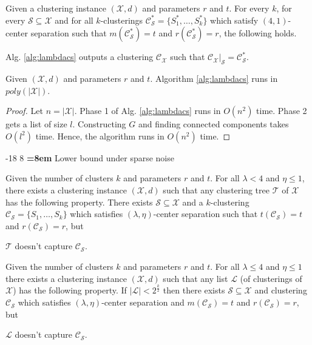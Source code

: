 \documentclass[orivec]{llncs}
\makeatletter
\newcommand{\mc}{\mathcal}
\renewcommand\subsubsection{\@startsection{subsubsection}{3}{\z@}%
   {-18\p@ \@plus -4\p@ \@minus -4\p@}%
   {8\p@ \@plus 4\p@ \@minus 4\p@}%
   {\normalfont\normalsize\bfseries\boldmath
   \rightskip=\z@ \@plus 8em \pretolerance=10000}}
\makeatother
\begin{document}
\begin{theorem}
\label{thm:lambdacsnoise}
Given a clustering instance $(\mc X, d)$ and parameters $r$ and $t$. For every $k$, for every $\mc S \subseteq \mc X$ and for all $k$-clusterings $\mc C^*_{\mc S} = \{S_1^*, \ldots, S_k^*\}$ which satisfy $(4, 1)$-center separation such that $ m(\mc C_{\mc S}^*) = t$ and $r(\mc C_{\mc S}^*) = r$, the following holds.

Alg. \ref{alg:lambdacs} outputs a clustering $\mc C_{\mc X}$ such that $\mc C_{\mc X}|_{\mc S} = \mc C_{\mc S}^*$.
\end{theorem}

\begin{theorem}
\label{thm:alglambdacstime}
Given $(\mc X, d)$ and parameters $r$ and $t$. Algorithm \ref{alg:lambdacs} runs in $poly(|\mc X|)$.
\end{theorem}

\begin{proof}
Let $n = |\mc X|$. Phase 1 of Alg. \ref{alg:lambdacs} runs in $O(n^2)$ time. Phase 2 gets a list of size $l$. Constructing $G$ and finding connected components takes $O(l^2)$ time. Hence, the algorithm runs in $O(n^2)$ time.
\end{proof}


\subsubsection{Lower bound under sparse noise}
\label{section:lambdaLowerBoundSparse}
\begin{theorem}
\label{thm:noalglambdacs}
Given the number of clusters $k$ and parameters $r$ and $t$. For all $\lambda < 4$ and $\eta \le 1$, there exists a clustering instance $(\mc X , d)$ such that any clustering tree $\mc T$ of $\mc X$ has the following property. There exists $\mc S \subseteq \mc X$ and a $k$-clustering $\mc C_{\mc S} = \{S_1, \ldots, S_k\}$ which satisfies $(\lambda, \eta)$-center separation such that $t(\mc C_{\mc S}) = t$ and $r(\mc C_{\mc S}) = r$, but

$\mc T$ doesn't capture $\mc C_{\mc S}$.
\end{theorem}

\begin{theorem}
\label{thm:nolistlambdacs}
Given the number of clusters $k$ and parameters $r$ and $t$. For all $\lambda \le 4$ and $\eta \le 1$ there exists a clustering instance $(\mc X, d)$ such that any list $\mc L$ (of clusterings of $\mc X$) has  the following property. If $|\mc L| < 2^{\frac{k}{2}}$ then there exists $\mc S \subseteq \mc X$ and clustering $\mc C_{\mc S}$ which satisfies $(\lambda, \eta)$-center separation and $ m(\mc C_{\mc S}) = t$ and $r(\mc C_{\mc S}) = r$, but 

$\mc L$ doesn't capture $\mc C_{\mc S}$.
\end{theorem}
\end{document}
